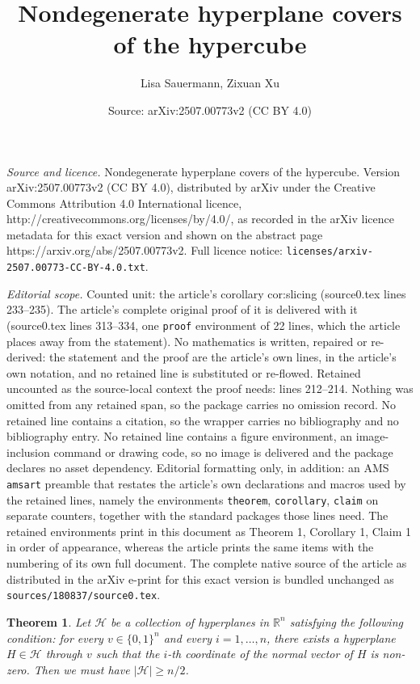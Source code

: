 \documentclass[10pt,a4paper]{amsart}
\title{Nondegenerate hyperplane covers of the hypercube}
\author{Lisa Sauermann, Zixuan Xu}
\date{Source: arXiv:2507.00773v2 (CC BY 4.0)}
\newtheorem{theorem}{Theorem}
\newcommand{\R}{\mathbb R}
\newcommand{\bin}{\{0,1\}}
\newcommand{\cH}{\mathcal H}
\renewcommand{\ge}{\geqslant}
\begin{document}
\maketitle

\noindent\emph{Source and licence.} Nondegenerate hyperplane covers of the hypercube. Version arXiv:2507.00773v2 (CC BY 4.0), distributed by arXiv under the Creative Commons Attribution 4.0 International licence, http://creativecommons.org/licenses/by/4.0/, as recorded in the arXiv licence metadata for this exact version and shown on the abstract page https://arxiv.org/abs/2507.00773v2. Full licence notice: \texttt{licenses/arxiv-2507.00773-CC-BY-4.0.txt}.\par\smallskip

\noindent\textit{Editorial scope.} Counted unit: the article's corollary cor:slicing (source0.tex lines 233--235). The article's complete original proof of it is delivered with it (source0.tex lines 313--334, one \texttt{proof} environment of 22 lines, which the article places away from the statement). No mathematics is written, repaired or re-derived: the statement and the proof are the article's own lines, in the article's own notation, and no retained line is substituted or re-flowed.  Retained uncounted as the source-local context the proof needs: lines 212--214.  Nothing was omitted from any retained span, so the package carries no omission record.  No retained line contains a citation, so the wrapper carries no bibliography and no bibliography entry.  No retained line contains a figure environment, an image-inclusion command or drawing code, so no image is delivered and the package declares no asset dependency.  Editorial formatting only, in addition: an AMS \texttt{amsart} preamble that restates the article's own declarations and macros used by the retained lines, namely the environments \texttt{theorem}, \texttt{corollary}, \texttt{claim} on separate counters, together with the standard packages those lines need.  The retained environments print in this document as Theorem 1, Corollary 1, Claim 1 in order of appearance, whereas the article prints the same items with the numbering of its own full document.  The complete native source of the article as distributed in the arXiv e-print for this exact version is bundled unchanged as \texttt{sources/180837/source0.tex}.
\begin{theorem}\label{thm:main}
    Let $\cH$ be a collection of hyperplanes in $\R^n$ satisfying the following condition: for every $v\in \bin^n$ and every $i=1,\dots,n$, there exists a hyperplane $H\in \mathcal{H}$ through $v$ such that the $i$-th coordinate of the normal vector of $H$ is non-zero. Then we must have $|\cH|\ge n/2$.
\end{theorem}
\end{document}

